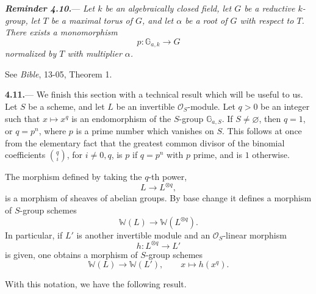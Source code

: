\par\medskip\noindent
\textbf{\textit{Reminder 4.10.}}---
\textit{Let \(k\) be an algebraically closed field, let \(G\) be a
reductive \(k\)-group, let \(T\) be a maximal torus of \(G\), and let
\(\alpha\) be a root of \(G\) with respect to \(T\).  There exists a
monomorphism}
\[
  p\colon\mathbb G_{a,k}\longrightarrow G
\]
\textit{normalized by \(T\) with multiplier \(\alpha\).}

See \emph{Bible}, 13-05, Theorem 1.

\par\medskip\noindent
\textbf{4.11.}---
We finish this section with a technical result which will be useful
to us.  Let \(S\) be a scheme, and let \(L\) be an invertible
\(\mathcal O_S\)-module.  Let \(q>0\) be an integer such that
\(x\longmapsto x^q\) is an endomorphism of the \(S\)-group
\(\mathbb G_{a,S}\).  If \(S\ne\varnothing\), then \(q=1\), or
\(q=p^n\), where \(p\) is a prime number which vanishes on \(S\).
This follows at once from the elementary fact that the greatest
common divisor of the binomial coefficients
\(\binom qi\), for \(i\ne0,q\), is \(p\) if \(q=p^n\) with \(p\)
prime, and is \(1\) otherwise.

The morphism defined by taking the \(q\)-th power,
\[
  L\longrightarrow L^{\otimes q},
\]
is a morphism of sheaves of abelian groups.  By base change it
defines a morphism of \(S\)-group schemes
\[
  \mathbb W(L)\longrightarrow\mathbb W(L^{\otimes q}).
\]
In particular, if \(L'\) is another invertible module and an
\(\mathcal O_S\)-linear morphism
\[
  h\colon L^{\otimes q}\longrightarrow L'
\]
is given, one obtains a morphism of \(S\)-group schemes
\[
  \mathbb W(L)\longrightarrow\mathbb W(L'),
  \qquad
  x\longmapsto h(x^q).
\]

With this notation, we have the following result.

